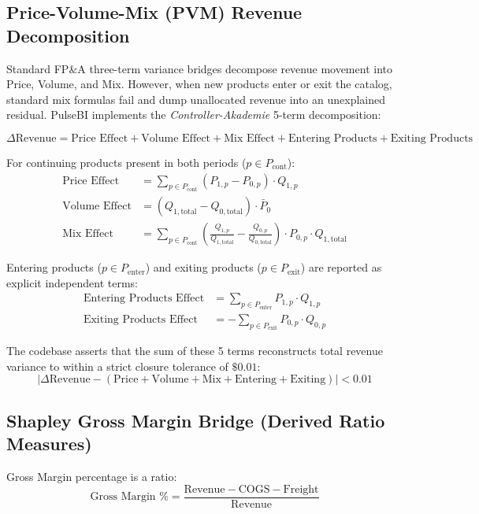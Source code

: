 \documentclass[11pt,a4paper]{article}
\begin{document}
\subsection{Price-Volume-Mix (PVM) Revenue Decomposition}
Standard FP\&A three-term variance bridges decompose revenue movement into Price, Volume, and Mix. However, when new products enter or exit the catalog, standard mix formulas fail and dump unallocated revenue into an unexplained residual. PulseBI implements the \textit{Controller-Akademie} 5-term decomposition:

\begin{equation}
\Delta \text{Revenue} = \text{Price Effect} + \text{Volume Effect} + \text{Mix Effect} + \text{Entering Products} + \text{Exiting Products}
\end{equation}

For continuing products present in both periods ($p \in P_{\text{cont}}$):
\begin{align}
\text{Price Effect} &= \sum_{p \in P_{\text{cont}}} (P_{1,p} - P_{0,p}) \cdot Q_{1,p} \\
\text{Volume Effect} &= (Q_{1,\text{total}} - Q_{0,\text{total}}) \cdot \bar{P}_{0} \\
\text{Mix Effect} &= \sum_{p \in P_{\text{cont}}} \left( \frac{Q_{1,p}}{Q_{1,\text{total}}} - \frac{Q_{0,p}}{Q_{0,\text{total}}} \right) \cdot P_{0,p} \cdot Q_{1,\text{total}}
\end{align}

Entering products ($p \in P_{\text{enter}}$) and exiting products ($p \in P_{\text{exit}}$) are reported as explicit independent terms:
\begin{align}
\text{Entering Products Effect} &= \sum_{p \in P_{\text{enter}}} P_{1,p} \cdot Q_{1,p} \\
\text{Exiting Products Effect} &= -\sum_{p \in P_{\text{exit}}} P_{0,p} \cdot Q_{0,p}
\end{align}

The codebase asserts that the sum of these 5 terms reconstructs total revenue variance to within a strict closure tolerance of $\$0.01$:
\begin{equation}
\left| \Delta \text{Revenue} - \left( \text{Price} + \text{Volume} + \text{Mix} + \text{Entering} + \text{Exiting} \right) \right| < 0.01
\end{equation}

\subsection{Shapley Gross Margin Bridge (Derived Ratio Measures)}
Gross Margin percentage is a ratio:
\begin{equation}
\text{Gross Margin \%} = \frac{\text{Revenue} - \text{COGS} - \text{Freight}}{\text{Revenue}}
\end{equation}
\end{document}
